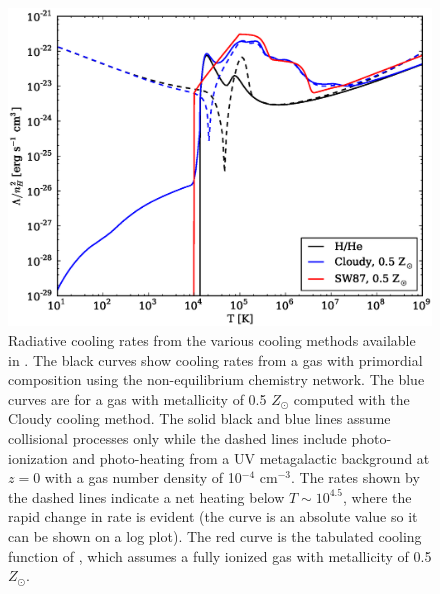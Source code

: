 \begin{figure}
  \begin{center}
    \includegraphics[width=1.0\textwidth]{figures/cooling_rate.eps}
  \end{center}
  \caption{Radiative cooling rates from the various cooling methods
    available in \enzo.  The black curves show cooling rates from a gas
    with primordial composition using the non-equilibrium chemistry
    network.  The blue curves are for a gas with metallicity of 0.5
    $Z_{\odot}$ computed with the Cloudy cooling method.  The solid
    black and blue lines assume collisional processes only while the
    dashed lines include photo-ionization and photo-heating from a UV
    metagalactic background at $z = 0$ with a gas number density of
    10$^{-4}$ cm$^{-3}$.  The rates shown by the
    dashed lines indicate a net heating below $T \sim 10^{4.5}$, where
    the rapid change in rate is evident (the curve is an absolute
    value so it can be shown on a log plot).  The red curve is the
    tabulated cooling function of \citet{SW87}, which assumes a fully
    ionized gas with metallicity of 0.5 $Z_{\odot}$.}
  \label{fig.cooling_rate}
\end{figure}
